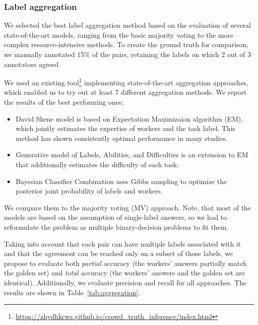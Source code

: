 \subsubsection{Label aggregation}
\label{label_aggregation}
We selected the best label aggregation method based on the evaluation of several state-of-the-art models, ranging from the basic majority voting to the more complex resource-intensive methods.
To create the ground truth for comparison, 
we manually annotated 15\% of the pairs, retaining the labels on which 2 out of 3 annotators agreed.

We used an existing tool\footnote{\url{https://zhydhkcws.github.io/crowd_truth_inference/index.html}} implementing state-of-the-art aggregation approaches, which enabled us to try out at least 7 different aggregation methods. We report the results of the best performing ones: 
\begin{itemize}
    \item David Skene model \cite[DS,][]{dawid1979maximum} is based on Expectation Maximizaion algorithm (EM), which jointly estimates the expertise of workers and the task label. This method has shown consistently optimal performance in many studies.
    \item Generative model of Labels, Abilities, and Difficulties \cite[GLAD,][]{whitehill2009whose} is an extension to EM that additionally estimates the difficulty of each task.
    \item Bayesian Classifier Combination \cite[BCC,][]{kim2012bayesian} uses Gibbs sampling to optimize the posterior joint probability of labels and workers.
\end{itemize}
We compare them to the majority voting (MV) approach. Note, that most of the models are based on the assumption of single-label answers, so we had to reformulate the problem as multiple binary-decision problems to fit them.

Taking into account that each pair can have multiple labels associated with it and that the agreement can be reached only on a subset of those labels, we propose to evaluate both \emph{partial} accuracy (the workers' answers partially match the golden set) and \emph{total} accuracy (the workers' answers and the golden set are identical). Additionally, we evaluate precision and recall for all approaches. The results are shown in Table~\ref{tab:aggregation}. 


